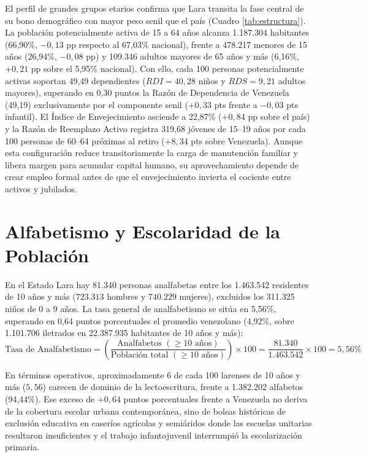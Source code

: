 \documentclass[12pt,letterpaper]{article}
\begin{document}
El perfil de grandes grupos etarios confirma que Lara transita la fase central de su bono demográfico con mayor peso senil que el país (Cuadro \ref{tab:estructura}). La población potencialmente activa de 15 a 64 años alcanza 1.187.304 habitantes (66,90\%, $-0,13$ pp respecto al 67,03\% nacional), frente a 478.217 menores de 15 años (26,94\%, $-0,08$ pp) y 109.346 adultos mayores de 65 años y más (6,16\%, $+0,21$ pp sobre el 5,95\% nacional). Con ello, cada 100 personas potencialmente activas soportan 49,49 dependientes ($RDI = 40,28$ niños y $RDS = 9,21$ adultos mayores), superando en 0,30 puntos la Razón de Dependencia de Venezuela (49,19) exclusivamente por el componente senil ($+0,33$ pts frente a $-0,03$ pts infantil). El Índice de Envejecimiento asciende a 22,87\% ($+0,84$ pp sobre el país) y la Razón de Reemplazo Activo registra 319,68 jóvenes de 15--19 años por cada 100 personas de 60--64 próximas al retiro ($+8,34$ pts sobre Venezuela). Aunque esta configuración reduce transitoriamente la carga de manutención familiar y libera margen para acumular capital humano, su aprovechamiento depende de crear empleo formal antes de que el envejecimiento invierta el cociente entre activos y jubilados.

\section{Alfabetismo y Escolaridad de la Población}

En el Estado Lara hay 81.340 personas analfabetas entre los 1.463.542 residentes de 10 años y más ($723.313$ hombres y $740.229$ mujeres), excluidos los 311.325 niños de 0 a 9 años. La tasa general de analfabetismo se sitúa en 5,56\%, superando en 0,64 puntos porcentuales el promedio venezolano (4,92\%, sobre 1.101.706 iletrados en 22.387.935 habitantes de 10 años y más):
\[
\text{Tasa de Analfabetismo} = \left( \dfrac{\text{Analfabetos } (\ge 10\text{ años})}{\text{Población total } (\ge 10\text{ años})} \right) \times 100 = \dfrac{81.340}{1.463.542} \times 100 = 5{,}56\%
\]

En términos operativos, aproximadamente 6 de cada 100 larenses de 10 años y más ($5,56$) carecen de dominio de la lectoescritura, frente a 1.382.202 alfabetos (94,44\%). Ese exceso de $+0,64$ puntos porcentuales frente a Venezuela no deriva de la cobertura escolar urbana contemporánea, sino de bolsas históricas de exclusión educativa en caseríos agrícolas y semiáridos donde las escuelas unitarias resultaron insuficientes y el trabajo infantojuvenil interrumpió la escolarización primaria.
\end{document}
